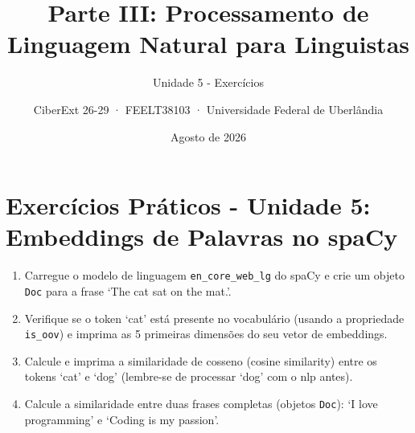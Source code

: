 \documentclass[
  brazilian,
]{article}
\title{Parte III: Processamento de Linguagem Natural para Linguistas}
\subtitle{Unidade 5 - Exercícios}
\author{CiberExt 26-29 · FEELT38103 · Universidade Federal de
Uberlândia}
\date{Agosto de 2026}
\begin{document}
\maketitle

\hypertarget{exercuxedcios-pruxe1ticos---unidade-5-embeddings-de-palavras-no-spacy}{%
\section{Exercícios Práticos - Unidade 5: Embeddings de Palavras no
spaCy}\label{exercuxedcios-pruxe1ticos---unidade-5-embeddings-de-palavras-no-spacy}}

\begin{enumerate}
\def\labelenumi{\arabic{enumi}.}
\item
  Carregue o modelo de linguagem \texttt{en\_core\_web\_lg} do spaCy e
  crie um objeto \texttt{Doc} para a frase `The cat sat on the mat.'.
\item
  Verifique se o token `cat' está presente no vocabulário (usando a
  propriedade \texttt{is\_oov}) e imprima as 5 primeiras dimensões do
  seu vetor de embeddings.
\item
  Calcule e imprima a similaridade de cosseno (cosine similarity) entre
  os tokens `cat' e `dog' (lembre-se de processar `dog' com o nlp
  antes).
\item
  Calcule a similaridade entre duas frases completas (objetos
  \texttt{Doc}): `I love programming' e `Coding is my passion'.
\end{enumerate}
\end{document}

